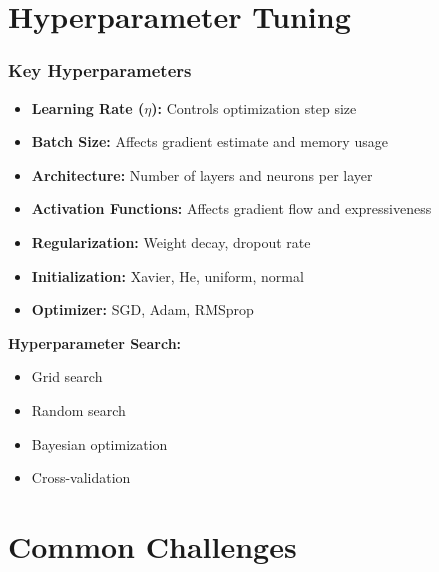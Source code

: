 \documentclass{beamer}
\begin{document}
\section{Hyperparameter Tuning}

\begin{frame}
\frametitle{Key Hyperparameters}
\begin{itemize}
    \item \textbf{Learning Rate ($\eta$):} Controls optimization step size
    \item \textbf{Batch Size:} Affects gradient estimate and memory usage
    \item \textbf{Architecture:} Number of layers and neurons per layer
    \item \textbf{Activation Functions:} Affects gradient flow and expressiveness
    \item \textbf{Regularization:} Weight decay, dropout rate
    \item \textbf{Initialization:} Xavier, He, uniform, normal
    \item \textbf{Optimizer:} SGD, Adam, RMSprop
\end{itemize}

\vspace{1em}

\textbf{Hyperparameter Search:}
\begin{itemize}
    \item Grid search
    \item Random search
    \item Bayesian optimization
    \item Cross-validation
\end{itemize}
\end{frame}

\section{Common Challenges}
\end{document}
